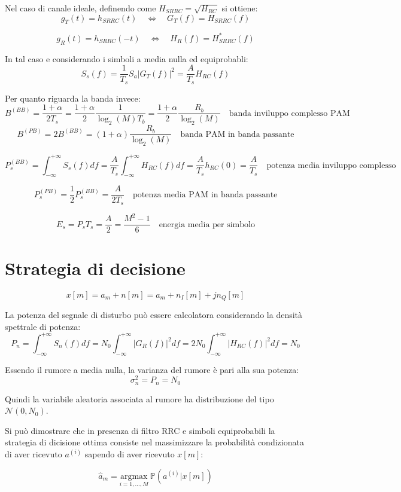Nel caso di canale ideale, definendo come $H_{SRRC} = \sqrt{H_{RC}}$ si ottiene:
\[
    g_T(t) = h_{SRRC}(t) \quad \Longleftrightarrow \quad G_T(f) = H_{SRRC}(f)
\]

\[
    g_R(t) = h_{SRRC}(-t) \quad \Longleftrightarrow \quad H_R(f) = H_{SRRC}^*(f)
\]


In tal caso e considerando i simboli a media nulla ed equiprobabli:
\[
    S_s(f) = \frac{1}{T_s} S_a |G_T(f)|^2 = \frac{A}{T_s} H_{RC}(f)
\]


Per quanto riguarda la banda invece:
\[
    B^{(BB)} = \frac{1+\alpha}{2T_s} = \frac{1+\alpha}{2} \frac{1}{\log_2(M) T_b} = \frac{1+\alpha}{2} \frac{R_b}{\log_2(M)} \quad \text{banda inviluppo complesso PAM}
\]
\[
    B^{(PB)} = 2 B^{(BB)} = (1+\alpha) \frac{R_b}{\log_2(M)} \quad \text{banda PAM in banda passante}
\]

\[
    P_s^{(BB)} = \int_{-\infty}^{+\infty} S_s(f) df = \frac{A}{T_s} \int_{-\infty}^{+\infty} H_{RC}(f) df = \frac{A}{T_s} h_{RC}(0) = \frac{A}{T_s} \quad \text{potenza media inviluppo complesso}
\]

\[
    P_s^{(PB)} = \frac{1}{2} P_s^{(BB)} = \frac{A}{2T_s} \quad \text{potenza media PAM in banda passante}
\]

\[
    E_s = P_s T_s = \frac{A}{2} = \frac{M^2 - 1}{6} \quad \text{energia media per simbolo}
\]


\section*{Strategia di decisione}


\[
    x[m] = a_m + n[m] = a_m + n_I[m] + jn_Q[m]
\]

La potenza del segnale di disturbo può essere calcolatora considerando la densità spettrale di potenza:
\[
    P_n = \int_{-\infty}^{+\infty} S_n(f) df = N_0 \int_{-\infty}^{+\infty} |G_R(f)|^2 df = 2N_0 \int_{-\infty}^{+\infty} |H_{RC}(f)|^2 df = N_0
\]

Essendo il rumore a media nulla, la varianza del rumore è pari alla sua potenza:
\[
    \sigma_n^2 = P_n = N_0
\]

Quindi la variabile aleatoria associata al rumore ha distribuzione del tipo $\mathcal{N}(0, N_0)$.

Si può dimostrare che in presenza di filtro RRC e simboli equiprobabili la strategia di dicisione ottima consiste nel massimizzare la probabilità condizionata di aver ricevuto $a^{(i)}$ sapendo di aver ricevuto $x[m]$:

\[
    \hat{a}_m = \underset{i=1,\ldots,M}{\mathrm{argmax}} \ \mathbb{P}(a^{(i)}|x[m])
\]

